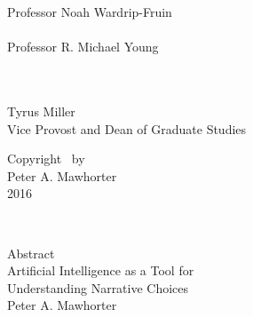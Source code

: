 \begin{titlepage}
{\hspace*{5em}Professor Noah Wardrip-Fruin \vspace{2.25\baselineskip} \\
\hspace*{5em}\underline{\hspace{20em}} \\
\hspace*{5em}Professor R. Michael Young \\
} \vspace{2.25\baselineskip} \\
\raggedright
\underline{\hspace{20em}} \\
Tyrus Miller \\
Vice Provost and Dean of Graduate Studies%
\end{titlepage}

\newpage

{
\centering
{}
\thispagestyle{empty}
\vspace*{\fill}
Copyright \textcopyright~by \\
Peter A. Mawhorter \\
2016 \\
\vspace*{\fill}
}
\newpage

{\let\cleardoublepage\clearpage
{}
\tableofcontents

\listoffigures

\listoftables
}

\newpage
\thispagestyle{plain}
~
\clearpage
{}

\vspace{0.5em}
{
\centering
{\LARGE Abstract} \\
{\Large Artificial Intelligence as a Tool for \\ Understanding Narrative Choices} \vspace{0.5em} \\
Peter A. Mawhorter \\
}
\vspace*{1em}

\addtolength{\baselineskip}{0pt plus 1pt minus 1pt}



